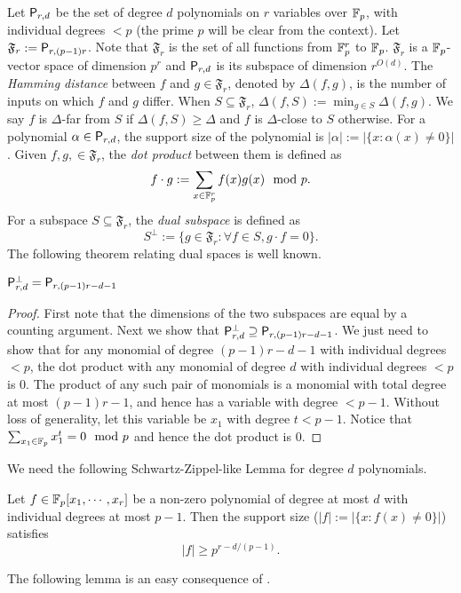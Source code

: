Let $\mathsf P_{r,d}$ be the set of degree $d$
polynomials on $r$ variables over $\mathbb F_p$, with individual degrees $< p$
(the prime $p$ will be clear from the context). Let
$\mathfrak F_r := \mathsf P_{r,(p-1)r}$. Note that $\mathfrak F_r$ is the set of all
functions from $\mathbb F_p^r$ to $\mathbb F_p$. $\mathfrak F_r$ is a $\mathbb F_p$-vector space of
dimension $p^r$ and $\mathsf P_{r,d}$ is its subspace of dimension $r^{O(d)}$. The
\emph{Hamming distance} between $f$ and $g \in \mathfrak F_r$, denoted by
$\Delta(f,g)$, is the number of inputs on which $f$ and $g$ differ. When $S
\subseteq \mathfrak F_r$, $\Delta(f, S) := \min_{g\in S} \Delta(f,g)$. We say
$f$ is $\Delta$-far from $S$ if $\Delta(f,S) \geq \Delta$ and $f$ is
$\Delta$-close to $S$ otherwise. For a polynomial $\alpha \in \mathsf P_{r,d}$,
the support size of the polynomial is $|\alpha| := |\{ x: \alpha(x) \neq 0\}|$.  
Given $f,g, \in \mathfrak F_r$, the \emph{dot
product} between them is defined as 
$$ f \cdot g  := \sum_{x \in\mathbb F_p^r}f(x)g(x) \mod p.$$ 
For a subspace $S \subseteq \mathfrak F_r$, the \emph{dual subspace}
is defined as 
$$S^{\perp} := \{ g \in \mathfrak F_r : \forall f \in S,  g \cdot f  = 0 \}.$$ 
The following theorem relating dual spaces is well known.

\begin{lemma} \label{lem:dual}
$\mathsf P_{r,d}^\perp =\mathsf P_{r,(p-1)r-d-1}$
\end{lemma} 
\begin{proof}
First note that the dimensions of the two subspaces are equal by a counting argument.
Next we show that $\mathsf P_{r,d}^\perp \supseteq \mathsf P_{r,(p-1)r-d-1}$. We just need to show that for any
monomial of degree $(p-1)r - d -1$ with individual degrees $<p$, the dot product with any monomial of
degree $d$ with individual degrees $<p$ is $0$. The product of any such pair of monomials
is a monomial with total degree at most $(p-1)r - 1$, and hence has a variable with
degree $<p-1$. Without loss of generality, let this variable be $x_1$ with degree $t < p-1$. 
 Notice that $\sum_{x_1 \in \mathbb F_p} x_1^t = 0 \mod p$  and hence the dot product is $0$. 
\end{proof}

We need the following Schwartz-Zippel-like Lemma for degree $d$ polynomials. 

\begin{lemma} 
\label{lem:SZ} Let $f\in \mathbb F_p[x_1,\cdots,x_r]$ be a
non-zero polynomial of degree at most $d$ with individual degrees at most $p-1$.
Then the support size ($|f| := |\{ x: f(x) \neq 0\}|$) satisfies
$$|f| \geq p^{r-d/(p-1)}.$$ 
\end{lemma}
 The following lemma is an easy consequence of .
 
